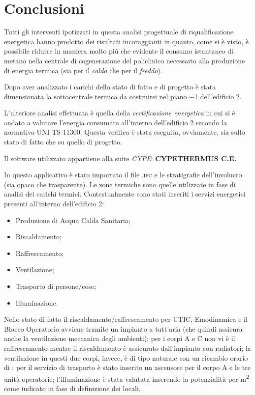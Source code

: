\chapter{Conclusioni}
\thispagestyle{empty}
Tutti gli interventi ipotizzati in questa analisi progettuale di riqualificazione energetica hanno prodotto dei risultati incoraggianti in quanto, come si è visto, è possibile ridurre in maniera molto più che evidente il consumo istantaneo di metano nella centrale di cogenerazione del policlinico necessario alla produzione di energia termica (sia per il \emph{caldo} che per il \emph{freddo}).

Dopo aver analizzato i carichi dello stato di fatto e di progetto è stata dimensionata la sottocentrale termica da costruirsi nel piano \num{-1} dell'edificio 2. 

L'ulteriore analisi effettuata è quella della \emph{certificazione energetica} in cui si è andato a valutare l'energia consumata all'interno dell'edificio 2 secondo la normativa UNI TS-11300. Questa verifica è stata eseguita, ovviamente, sia sullo stato di fatto che su quello di progetto.

Il software utilizzato appartiene alla suite \emph{CYPE}: \textbf{CYPETHERMUS C.E.}

In questo applicativo è stato importato il file \textsc{.ifc} e le stratigrafie dell'involucro (sia opaco che trasparente). Le zone termiche sono quelle utilizzate in fase di analisi dei carichi termici. Contestualmente sono stati inseriti i servizi energetici presenti all'interno dell'edificio 2:
\begin{itemize}
	\item Produzione di Acqua Calda Sanitaria;
	\item Riscaldamento;
	\item Raffrescamento;
	\item Ventilazione;
	\item Trasporto di persone/cose;
	\item Illuminazione.
\end{itemize}
Nello stato di fatto il riscaldamento/raffrescamento per UTIC, Emodinamica e il Blocco Operatorio avviene tramite un impianto a tutt'aria (che quindi assicura anche la ventilazione meccanica degli ambienti); per i corpi A e C non vi è il raffrescamento mentre il riscaldamento è assicurato dall'impianto con radiatori; la ventilazione in questi due corpi, invece, è di tipo naturale con un ricambio orario di ; per il servizio di trasporto è stato inserito un ascensore per il corpo A e le tre unità operatorie; l'illuminazione è stata valutata inserendo la potenzialità per \si{m^2} come indicato in fase di definizione dei locali.

